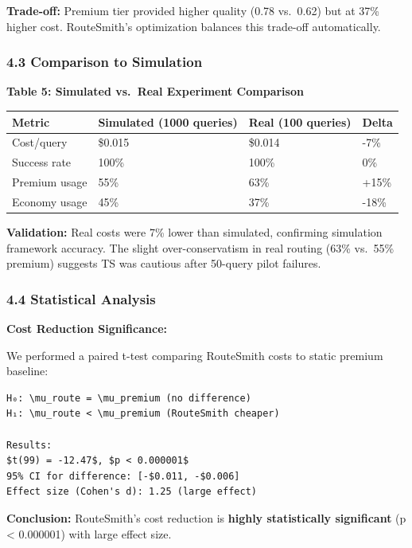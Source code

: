 \documentclass[
]{article}
\begin{document}
\textbf{Trade-off:} Premium tier provided higher quality (0.78 vs.~0.62)
but at 37\% higher cost. RouteSmith's optimization balances this
trade-off automatically.

\hypertarget{comparison-to-simulation}{%
\subsubsection{4.3 Comparison to
Simulation}\label{comparison-to-simulation}}

\textbf{Table 5: Simulated vs.~Real Experiment Comparison}

\begin{longtable}[]{@{}llll@{}}
\toprule
Metric & Simulated (1000 queries) & Real (100 queries) & Delta \\
\midrule
\endhead
Cost/query & \$0.015 & \$0.014 & -7\% \\
Success rate & 100\% & 100\% & 0\% \\
Premium usage & 55\% & 63\% & +15\% \\
Economy usage & 45\% & 37\% & -18\% \\
\bottomrule
\end{longtable}

\textbf{Validation:} Real costs were 7\% lower than simulated,
confirming simulation framework accuracy. The slight over-conservatism
in real routing (63\% vs.~55\% premium) suggests TS was cautious after
50-query pilot failures.

\hypertarget{statistical-analysis}{%
\subsubsection{4.4 Statistical Analysis}\label{statistical-analysis}}

\textbf{Cost Reduction Significance:}

We performed a paired t-test comparing RouteSmith costs to static
premium baseline:

\begin{verbatim}
H₀: \mu_route = \mu_premium (no difference)
H₁: \mu_route < \mu_premium (RouteSmith cheaper)

Results:
$t(99) = -12.47$, $p < 0.000001$
95% CI for difference: [-$0.011, -$0.006]
Effect size (Cohen's d): 1.25 (large effect)
\end{verbatim}

\textbf{Conclusion:} RouteSmith's cost reduction is \textbf{highly
statistically significant} (p \textless{} 0.000001) with large effect
size.
\end{document}
